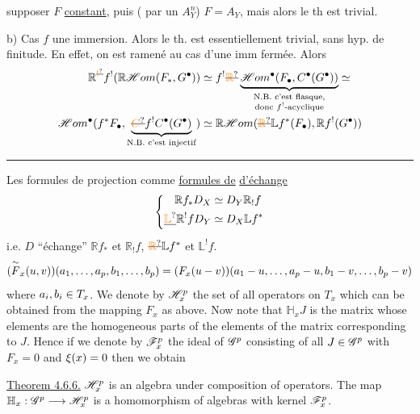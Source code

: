 supposer $F$ \uline{constant}, puis ( par un $A_Y^n$) $F=A_Y$, mais alors le th est trivial.

b) Cas $f$ une immersion. Alors le th. est essentiellement trivial, sans hyp. de finitude. En effet, on est ramené au cas d'une imm fermée. Alors
\[
\begin{aligned}
\mathbb R^{\deleted{\unsure{!}}}f^!(\mathbb R\mathscr Hom(F_{*},G^{\bullet}))&\simeq f^!\deleted{\unsure{\mathbb R}}\underbrace{\mathscr Hom^{\bullet}(F_{\bullet},C^{\bullet}(G^{\bullet}))}_{\substack{\text{N.B. c'est flasque,}\\\text{donc }f^!\text{-acyclique}}}\simeq\\
\mathscr Hom^{\bullet}(f^*F_{\bullet},\underbrace{\deleted{\unsure{C}}f^!C^{\bullet}(G^{\bullet})}_{\text{N.B. c'est injectif}})&\simeq\mathbb R\mathscr Hom(\deleted{\unsure{\mathbb R}}\mathbb L f^*(F_{\bullet}),\mathbb Rf^!(G^{\bullet}))
\end{aligned}
\]

\noindent\rule{.35\linewidth}{.3pt}

Les formules de projection  comme \uline{formules de}  \uline{d'échange}
\[
\left\{\begin{aligned}
\mathbb R f_*D_X&\simeq D_Y\mathbb R_!f\\
\deleted{\unsure{\mathbb L}}\mathbb R^!fD_Y&\simeq D_X\mathbb L f^*
\end{aligned}\right.
\]
i.e. $D$ ``échange'' $\mathbb Rf_*$ et $\mathbb R_!f$, $\deleted{\unsure{\mathbb R}}\mathbb Lf^*$ et $\mathbb L^!f$.
\[
(\overset{\sim}{F}_x(u,v))(a_1,\ldots,a_p,b_1,\ldots,b_p)=(F_x(u-v))(a_1-u,\ldots,a_p-u,b_1-v,\ldots,b_p-v)
\]
where $a_i,b_i\in T_x$. We denote by $\mathscr H_x^p$ the set of all operators on $T_x$ which can be obtained from the mapping $F_x$ as above. Now note that $\mathbb H_x J$ is the matrix whose elements are the homogeneous parts of the elements of the matrix corresponding to $J$. Hence if we denote by $\mathscr F_x^p$ the ideal of $\mathscr G^p$ consisting of all $J\in\mathscr G^p$ with $F_x=0$ and $\xi(x)=0$ then we obtain

\uline{Theorem 4.6.6.} $\mathscr H_x^p$ is an algebra under composition of operators. The map $\mathbb H_x:\mathscr G^p\longrightarrow\mathscr H_x^p$ is a homomorphism of algebras with kernel $\mathscr F_x^p$.

